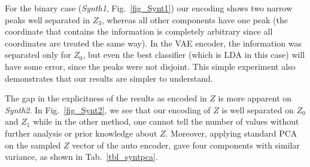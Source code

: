 \documentclass[10pt,twocolumn,letterpaper]{article}
\begin{document}
For the binary case (\textit{Synth1}, Fig.~\ref{fig_Synt1}) our encoding shows two narrow peaks well separated in $Z_3$, whereas all other components have one peak %
(the coordinate that contains the information is completely arbitrary since all coordinates are treated the same way). In the VAE encoder, the information was separated only for $Z_0$, but even the best classifier (which is LDA in this case) will have some error, since the peaks were not disjoint. This simple experiment also demonstrates that our results are simpler to understand. 

The gap in the explicitness of the results as encoded in $Z$  is more apparent on \textit{Synth2}. In Fig.~\ref{fig_Synt2}, we see that our encoding of $Z$ is well separated on $Z_0$ and $Z_1$ while in the other method, one cannot tell the number of values without further analysis or prior knowledge about $Z$. Moreover, applying standard PCA on the sampled $Z$ vector of the auto encoder, gave four components with similar variance, as shown in Tab.~\ref{tbl_syntpca}.    

\end{document}
